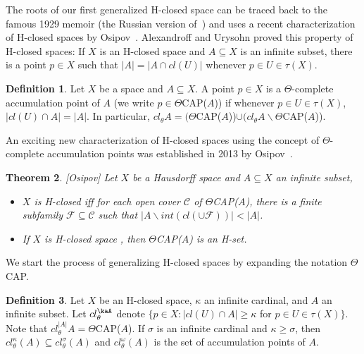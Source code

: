 \documentclass[11pt]{amsart}
\newif\ifdraft\draftfalse
\newtheorem{theorem}{Theorem}[section]
\theoremstyle{definition}
\newtheorem{definition}[theorem]{Definition}
\theoremstyle{remark}
\numberwithin{equation}{section}
\begin{document}
The roots of our first generalized H-closed space can be traced back  to  the famous 1929 memoir (the Russian version of~\cite{Ale-Ury}) and uses a recent characterization of H-closed spaces by Osipov~\cite{O}.  Alexandroff and Urysohn proved this property of H-closed spaces: If $X$ is an H-closed space and $A \subseteq X$ is an infinite subset, there is a point $p \in X$ such that $|A| = |A \cap cl(U)|$ whenever $p \in U \in \tau(X)$.  

\begin{definition} Let $X$ be a space and  $A \subseteq X$. A point $p \in X$ is a $
\Theta$-complete accumulation point of $A$ (we write $p \in \Theta$CAP($A$)) if whenever $p \in U \in \tau(X)$, $|cl(U) \cap A| = |A|$.  In particular, $cl_{\theta}A = (\Theta$CAP($A$))$ \cup  (cl_{\theta}A\backslash\Theta$CAP($A$)).
\end{definition}

An exciting new characterization of H-closed spaces using the concept of $\Theta$-complete accumulation points was established in 2013  by Osipov~\cite{O}.

\begin{theorem}{{\immediate{}}{\ifdraft\hspace{-\lastskip}\vadjust{\vspace{-1mm}\smash{\llap{{\tt {{osipov}}}\hspace{8mm}}}\vspace{1mm}}\fi}}{\rm{[Osipov]}} Let $X$ be a Hausdorff space and $A {\subseteq} X$ an infinite subset,
\begin{itemize}
\item[(a)] $X$ is H-closed iff for each  open cover $\mathcal{C}$ of $\Theta$CAP($A$), there is a finite subfamily ${\ensuremath{\mathcal{{F}}}} \subseteq{\ensuremath{\mathcal{{C}}}}$ such that    $|A \backslash int(cl(\cup{\ensuremath{\mathcal{{F}}}}))| < |A|$. 
\item[(b)] If $X$ is H-closed space , then  $\Theta$CAP($A$) is an H-set. 
\end{itemize} 
\end{theorem}

We start the process of generalizing H-closed spaces by expanding the notation $\Theta$CAP. 

\begin{definition} Let $X$ be an H-closed space, ${\kappa}$ an infinite cardinal, and $A$ an infinite subset. Let $cl_{\theta }^\kaA$ denote $\{p \in X: |cl(U) \cap A| \geq {\kappa}$ for $p \in U \in \tau(X)\}$.  Note that $cl_{\theta }^{|A|}A  = \Theta$CAP($A$).  If $\sigma$ is an infinite cardinal and  $\kappa \geq \sigma$, then $cl^{\kappa}_{\theta}(A) \subseteq cl^{\sigma}_{\theta}(A)$  and $cl^{\omega}_{\theta}(A)$ is the set of accumulation points of $A$.
\end{definition}
\end{document}
